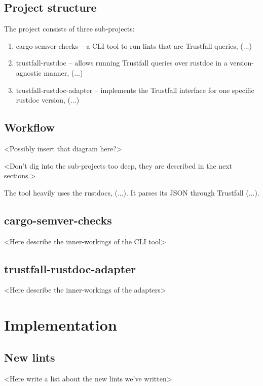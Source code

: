 \documentclass[licencjacka,en]{pracamgr}
\begin{document}
\section{Project structure}

The project consists of three sub-projects:
\begin{enumerate}
	\item cargo-semver-checks -- a CLI tool to run lints that are Trustfall queries, (...)
	\item trustfall-rustdoc -- allows running Trustfall queries over rustdoc in a version-agnostic manner, (...)
	\item trustfall-rustdoc-adapter -- implements the Trustfall interface for one specific rustdoc version, (...)
\end{enumerate}


\section{Workflow}

<Possibly insert that diagram here?>

<Don't dig into the sub-projects too deep, they are described in the next sections.>

The tool heavily uses the rustdocs, (...).
It parses its JSON through Trustfall (...).


\section{cargo-semver-checks}

<Here describe the inner-workings of the CLI tool>


\section{trustfall-rustdoc-adapter}

<Here describe the inner-workings of the adapters>



\chapter{Implementation}\label{r:implementation}

\section{New lints}

<Here write a list about the new lints we've written>
\end{document}
